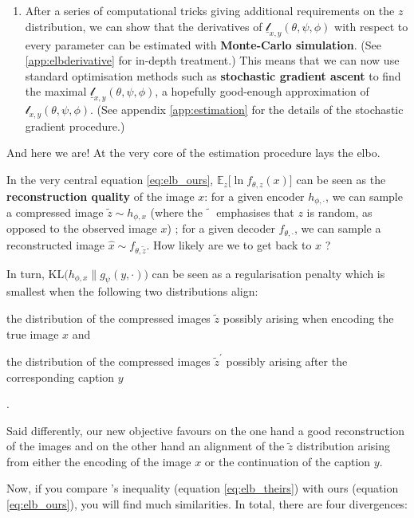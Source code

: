 \documentclass{article}
\begin{document}
\begin{multicols}{2}
\begin{enumerate}
    \item After a series of computational tricks giving additional requirements on the $z$ distribution, we can show that the derivatives of $\underline{\mathscr{l}}_{x,y}(\theta,\psi,\phi)$ with respect to every parameter can be estimated with \textbf{Monte-Carlo simulation}. (See \ref{app:elbderivative} for in-depth treatment.) This means that we can now use standard optimisation methods such as \textbf{stochastic gradient ascent} to find the maximal $\underline{\mathscr{l}}_{x,y}(\theta,\psi,\phi)$, a hopefully good-enough approximation of $\mathscr{l}_{x,y}(\theta,\psi,\phi)$. (See appendix  \ref{app:estimation} for the details of the stochastic gradient procedure.)
\end{enumerate}

And here we are! At the very core of the estimation procedure lays the \gls{elbo}.

In the very central equation \ref{eq:elb_ours}, $\mathbb{E}_z \Big[\ln f_{\theta,z}(x)\Big]$ can be seen as the \textbf{reconstruction quality} of the image $x$: for a given encoder $h_{\phi,\cdot}$,  we can sample a compressed image $\tilde z\sim h_{\phi,x}$ (where the $\tilde{\phantom{x}}$ emphasises that $z$ is random, as opposed to the observed image $x$) ; for a given decoder $f_{\theta,\cdot}$, we can sample a reconstructed image $\hat x\sim f_{\theta,\tilde z}$. How likely are we to get back to $x$ ?

In turn, $\textrm{KL}\Big( h_{\phi,x} \| g_\psi(y,\cdot) \Big)$ can be seen as a regularisation penalty which is smallest when the following two distributions align: \begin{enumerate*}[label=(\roman*)] \item the distribution of the compressed images $\tilde z$ possibly arising when encoding the true image $x$ and \item the distribution of the compressed images $\tilde z^\prime$ possibly arising after the corresponding caption $y$\end{enumerate*}.

Said differently, our new objective favours on the one hand a good reconstruction of the images and on the other hand an alignment of the $\tilde z$ distribution arising from either the encoding of the image $x$ or the continuation of the caption $y$.

Now, if you compare \citeauthor{zeroshot}'s inequality (equation \ref{eq:elb_theirs}) with ours (equation \ref{eq:elb_ours}), you will find much similarities. In total, there are four divergences:


\end{multicols}
\end{document}
